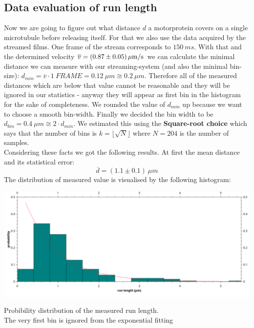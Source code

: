     \subsection{Data evaluation of run length}
    	Now we are going to figure out what distance $d$ a motorprotein covers on a single microtubule before releasing itself. For that we also use the data acquired by the streamed films. One frame of the stream corresponds to $150\ \unit{ms}$. With that and the determined velocity $\overline v = \unit[(0.87 \pm 0.05)]{\mu m/s}$ we can calculate the minimal distance we can measure with our streaming-system (and also the minimal bin-size): $d_{min} = \overline{v} \cdot 1\ \unit{FRAME} = 0.12\ \unit{\mu m} \cong 0.2\ \unit{\mu m}$. Therefore all of the measured distances which are below that value cannot be reasonable and they will be ignored in our statistics - anyway they will appear as first bin in the histogram for the sake of completeness. We rounded the value of $d_{min}$ up because we want to choose a smooth bin-width. Finally we decided the bin width to be $d_{bin} = 0.4\ \unit{\mu m} \cong 2 \cdot {d_{min}}$. We estimated this using the \textbf{Square-root choice}\cite{wikiHisto} which says that the number of bins is $k = \lfloor\sqrt{N}\rfloor$ where $N = 204$ is the number of samples.\\
    	Considering these facts we got the following results. At first the mean distance and its statistical error:
    	\begin{equation*}
    		\overline{d} = (1.1 \pm 0.1)\ \unit{\mu m}
    	\end{equation*}
    	The distribution of measured value is visualised by the following histogram:
    	 \minipanf
    	                \begin{center}
    	                \includegraphics[scale=0.3]{pic/histo_runlength_rel.png}
    	                \label{exp:histRun}
    	                \caption{Probibility distribution of the measured run length.\\ The very first bin is ignored from the exponential fitting}
    	                \end{center}
    	 \minipend
    	            
